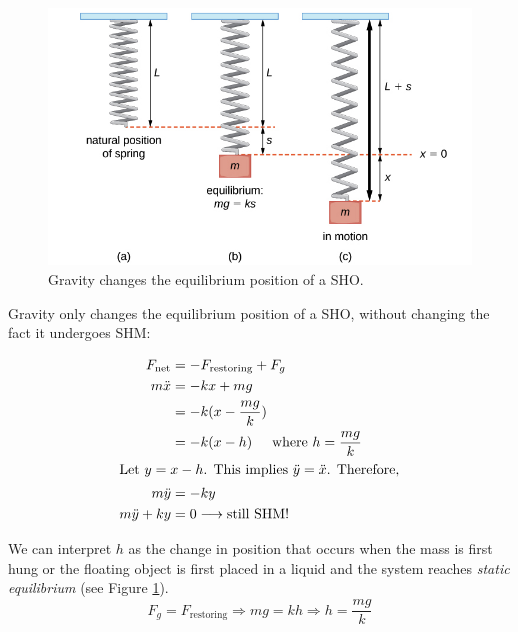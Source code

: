 \documentclass[11pt,letterpaper,titlepage,oneside]{book}
\newcommand{\htab}{\hspace{0.5cm}}
\newcommand{\where}{\htab\text{where }}
\begin{document}
\begin{figure}[h]
	\centering
	\includegraphics[scale=0.5]{phys232/Ch3-g-new-eqm} \caption{Gravity changes the equilibrium position of a SHO.}\label{fig:ch3-g-new-eqm-pos}
\end{figure}

Gravity only changes the equilibrium position of a SHO, without changing the fact it undergoes SHM:

\begin{align*}
	F_\text{net} &= -F_\text{restoring} + F_g \\
	m\ddot{x} &= -kx + mg \\
	& = -k(x - \frac{mg}{k}) \\
	& = -k(x - h) \where h=\frac{mg}{k}\\
	\intertext{Let $y=x-h$. This implies $\ddot{y} = \ddot{x}$. Therefore,}
	m\ddot{y} &= -ky \\
	m\ddot{y} + ky &= 0  \longrightarrow \text{still SHM!}
\end{align*}

We can interpret $h$ as the change in position that occurs when the mass is first hung or the floating object is first placed in a liquid and the system reaches \emph{static equilibrium} (see Figure \ref{fig:ch3-g-new-eqm-pos}).
\[ F_g = F_\text{restoring}\Longrightarrow mg = kh \Longrightarrow h = \frac{mg}{k} \]
\end{document}

